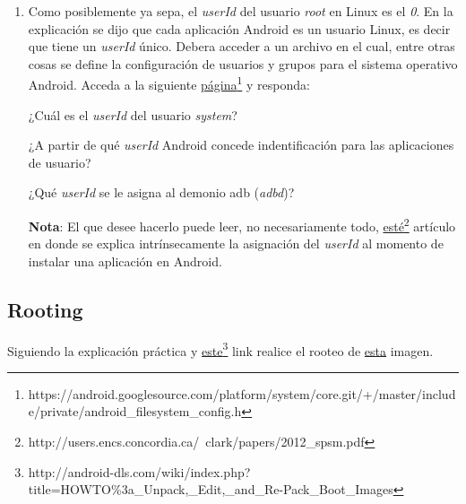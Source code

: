 \begin{itemize}
\begin{enumerate}
    \item Como posiblemente ya sepa, el \textit{userId} del usuario \textit{root} en Linux es el \emph{0}. En la explicación se dijo que cada aplicación Android es un usuario Linux, es decir que tiene un \textit{userId} único. Debera acceder a un archivo en el cual, entre otras cosas se define la configuración de usuarios y grupos para el sistema operativo Android. Acceda a la siguiente \href{https://android.googlesource.com/platform/system/core.git/+/master/include/private/android\_filesystem\_config.h}{página}\footnote{https://android.googlesource.com/platform/system/core.git/+/master/include/private/android\_filesystem\_config.h} y responda:
    \begin{questions}
        \question ¿Cuál es el \textit{userId} del usuario \emph{system}?
        
        \question ¿A partir de qué \textit{userId} Android concede indentificación para las aplicaciones de usuario?
        
        \question ¿Qué \textit{userId} se le asigna al demonio adb (\textit{adbd})?
    \end{questions}
    
    \textbf{Nota}: El que desee hacerlo puede leer, no necesariamente todo, \href{http://users.encs.concordia.ca/~clark/papers/2012\_spsm.pdf}{esté}\footnote{http://users.encs.concordia.ca/~clark/papers/2012\_spsm.pdf} artículo en donde se explica intrínsecamente la asignación del \textit{userId} al momento de instalar una aplicación en Android.
    \end{enumerate}
\end{itemize}

\subsection{Rooting}
\begin{questions}
  \question Siguiendo la explicación práctica y \href{http://android-dls.com/wiki/index.php?title=HOWTO%3a\_Unpack,\_Edit,\_and\_Re-Pack\_Boot\_Images}{este}\footnote{http://android-dls.com/wiki/index.php?title=HOWTO\%3a\_Unpack,\_Edit,\_and\_Re-Pack\_Boot\_Images} link realice el rooteo de \href{}{esta} imagen.
\end{questions}